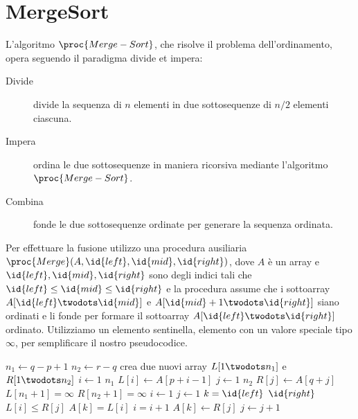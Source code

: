 \section{MergeSort}
L'algoritmo $\proc{Merge-Sort}$, che risolve il problema dell'ordinamento, opera seguendo il paradigma divide et impera:
\begin{description}
    \item[Divide] divide la sequenza di $n$ elementi in due sottosequenze di $n/2$ elementi ciascuna.
    \item[Impera] ordina le due sottosequenze in maniera ricorsiva mediante l'algoritmo $\proc{Merge-Sort}$.
    \item[Combina] fonde le due sottosequenze ordinate per generare la sequenza ordinata.
\end{description}
Per effettuare la fusione utilizzo una procedura ausiliaria $\proc{Merge}(A,\id{left},\id{mid},\id{right})$,
dove $A$ è un array e $\id{left},\id{mid},\id{right}$ sono degli indici tali che
$\id{left} \leq \id{mid} \leq \id{right}$ e la procedura assume che i sottoarray
$A[\id{left} \twodots \id{mid}]$ e $A[\id{mid}+1 \twodots \id{right}]$ siano ordinati
e li fonde per formare il sottoarray $A[\id{left} \twodots \id{right}]$ ordinato.
Utilizziamo un elemento sentinella, elemento con un valore speciale tipo $\infty$,
per semplificare il nostro pseudocodice.
\begin{codebox}
\li $n_1 \gets q - p + 1$
\li $n_2 \gets r - q$
\li crea due nuovi array $L[1 \twodots n_1]$ e $R[1 \twodots n_2]$
\li \For $i \gets 1$ \To $n_1$
         \Do
\li      $L[i] \gets A[p+i-1]$
        \End
\li \For $j \gets 1$ \To $n_2$
        \Do
\li      $R[j] \gets A[q+j]$
        \End
\li $L[n_1+1] = \infty$
\li $R[n_2+1] = \infty$
\li $i \gets 1$
\li $j \gets 1$
\li \For $k = \id{left}$ \To $\id{right}$
    \Do
\li      \If $L[i] \leq R[j]$
         \Then
\li              $A[k] = L[i]$
\li              $i = i+1$
         \End
\li      \Else $A[k] \gets R[j]$
\li            $j \gets j+1$
    \End
\end{codebox}


